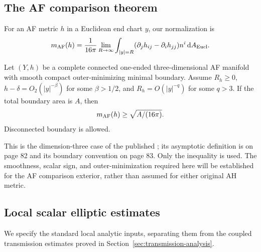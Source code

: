 \subsection{The AF comparison theorem}

For an AF metric $h$ in a Euclidean end chart $y$, our normalization is
\begin{equation}\label{eq:adm-mass}
 m_{\mathrm{AF}}(h)=\frac1{16\pi}\lim_{R\to\infty}
 \int_{|y|=R}(\partial_jh_{ij}-\partial_ih_{jj})
                  n^i\mathop{}\!\mathrm d A_{\mathrm{Eucl}}.
\end{equation}

\begin{theorem}\label{thm:af-penrose}
Let $(Y,h)$ be a complete connected one-ended three-dimensional AF
manifold with smooth compact outer-minimizing minimal boundary.
Assume $R_h\ge0$, $h-\delta=O_2(|y|^{-\beta})$ for some
$\beta>1/2$, and $R_h=O(|y|^{-q})$ for some $q>3$.
If the total boundary area is $A$, then
\begin{equation}\label{eq:af-penrose}
 m_{\mathrm{AF}}(h)\ge\sqrt{A/(16\pi)}.
\end{equation}
Disconnected boundary is allowed.
\end{theorem}

This is the dimension-three case of the published
\citet[Theorem 1.4]{BrayLee2009}; its asymptotic definition is on
page 82 and its boundary convention on page 83.
Only the inequality is used. The smoothness, scalar sign, and
outer-minimization required here will be established for the AF
comparison exterior, rather than assumed for either original AH
metric.

\subsection{Local scalar elliptic estimates}

We specify the standard local analytic inputs, separating them from
the coupled transmission estimates proved in
Section~\ref{sec:transmission-analysis}.

